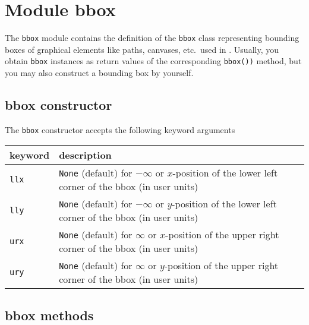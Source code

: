 \chapter{Module bbox}

\label{bbox}

The \texttt{bbox} module contains the definition of the \texttt{bbox}
class representing bounding boxes of graphical elements like paths,
canvases, etc.\ used in \PyX. Usually, you obtain \texttt{bbox}
instances as return values of the corresponding \texttt{bbox())}
method, but you may also construct a bounding box by yourself.

\section{bbox constructor}

The \texttt{bbox} constructor accepts the following keyword arguments

\medskip
\begin{tabularx}{\linewidth}{l>{\raggedright\arraybackslash}X}
keyword & description\\
\hline
\texttt{llx}&\texttt{None} (default) for $-\infty$ or $x$-position of
the lower left corner of the bbox (in user units)\\
\texttt{lly}&\texttt{None} (default) for $-\infty$ or $y$-position of
the lower left corner of the bbox (in user units)\\
\texttt{urx}&\texttt{None} (default) for $\infty$ or $x$-position of
the upper right corner of the bbox (in user units)\\
\texttt{ury}&\texttt{None} (default) for $\infty$ or $y$-position of
the upper right corner of the bbox (in user units)
\end{tabularx}

\section{bbox methods}


